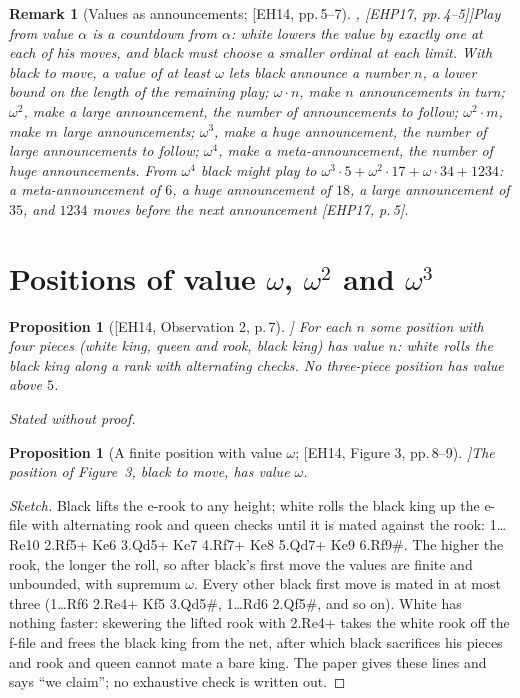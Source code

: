 \documentclass[10pt]{article}
\theoremstyle{notes}
\newtheorem{proposition}[theorem]{Proposition}
\newtheorem{remark}[theorem]{Remark}
\newenvironment{sketch}{\begin{proof}[Sketch]\renewcommand{\qedsymbol}{}}{\end{proof}}
\newcommand{\stated}{\par\noindent\emph{Stated without proof.}\par}
\newcommand{\EH}[1]{[EH14, #1]}
\newcommand{\EHP}[1]{[EHP17, #1]}
\begin{document}
\begin{remark}[Values as announcements; \EH{pp.\,5--7}, \EHP{pp.\,4--5}]\label{rem:announce}
Play from value $\alpha$ is a countdown from $\alpha$: white lowers the value by exactly one at each of his
moves, and black must choose a smaller ordinal at each limit. With black to move, a value of at least
$\omega$ lets black \emph{announce} a number $n$, a lower bound on the length of the remaining play;
$\omega\cdot n$, make $n$ announcements in turn; $\omega^2$, make a \emph{large announcement}, the number of
announcements to follow; $\omega^2\cdot m$, make $m$ large announcements; $\omega^3$, make a \emph{huge
announcement}, the number of large announcements to follow; $\omega^4$, make a \emph{meta-announcement}, the
number of huge announcements. From $\omega^4$ black might play to
$\omega^3\cdot 5+\omega^2\cdot 17+\omega\cdot 34+1234$: a meta-announcement of $6$, a huge announcement of
$18$, a large announcement of $35$, and $1234$ moves before the next announcement \EHP{p.\,5}.
\end{remark}

\section{Positions of value \texorpdfstring{$\omega$, $\omega^2$ and $\omega^3$}{omega, omega squared and omega cubed}}

\begin{proposition}[\EH{Observation 2, p.\,7}]
For each $n$ some position with four pieces (white king, queen and rook, black king) has value $n$: white
rolls the black king along a rank with alternating checks. No three-piece position has value above $5$.
\stated
\end{proposition}

\begin{proposition}[A finite position with value $\omega$; \EH{Figure 3, pp.\,8--9}]\label{prop:omega}
The position of Figure~3, black to move, has value $\omega$.
\end{proposition}

\begin{sketch}
Black lifts the e-rook to any height; white rolls the black king up the e-file with alternating rook and
queen checks until it is mated against the rook: 1\ldots Re10 2.Rf5+ Ke6 3.Qd5+ Ke7 4.Rf7+ Ke8 5.Qd7+ Ke9
6.Rf9\#. The higher the rook, the longer the roll, so after black's first move the values are finite and
unbounded, with supremum $\omega$. Every other black first move is mated in at most three (1\ldots Rf6 2.Re4+ Kf5
3.Qd5\#, 1\ldots Rd6 2.Qf5\#, and so on). White has nothing faster: skewering the lifted rook with 2.Re4+
takes the white rook off the f-file and frees the black king from the net, after which black sacrifices his
pieces and rook and queen cannot mate a bare king. The paper gives these lines and says ``we claim''; no
exhaustive check is written out.
\end{sketch}
\end{document}
